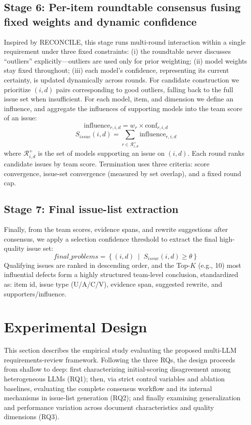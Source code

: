 \documentclass[sn-mathphys-num]{sn-jnl}
\begin{document}
\subsection{Stage 6: Per-item roundtable consensus fusing fixed weights and dynamic confidence}
Inspired by RECONCILE, this stage runs multi-round interaction within a single requirement under three fixed constraints: (i) the roundtable never discusses ``outliers'' explicitly---outliers are used only for prior weighting; (ii) model weights stay fixed throughout; (iii) each model's confidence, representing its current certainty, is updated dynamically across rounds. For candidate construction we prioritize $(i,d)$ pairs corresponding to good outliers, falling back to the full issue set when insufficient. For each model, item, and dimension we define an influence, and aggregate the influences of supporting models into the team score of an issue:
\begin{equation}
\mathrm{influence}_{r,i,d} = w_r \times \mathrm{conf}_{r,i,d}
\label{eq:influence}
\end{equation}
\begin{equation}
S_{issue}(i,d) = \sum_{r \in \mathcal{R}^{+}_{i,d}} \mathrm{influence}_{r,i,d}
\label{eq:Sissue}
\end{equation}
where $\mathcal{R}^{+}_{i,d}$ is the set of models supporting an issue on $(i,d)$. Each round ranks candidate issues by team score. Termination uses three criteria: score convergence, issue-set convergence (measured by set overlap), and a fixed round cap.

\subsection{Stage 7: Final issue-list extraction}
Finally, from the team scores, evidence spans, and rewrite suggestions after consensus, we apply a selection confidence threshold to extract the final high-quality issue set:
\begin{equation}
\mathit{final\_problems} = \left\{ (i,d) \;\middle|\; S_{issue}(i,d) \ge \theta \right\}
\label{eq:final}
\end{equation}
Qualifying issues are ranked in descending order, and the Top-$K$ (e.g., 10) most influential defects form a highly structured team-level conclusion, standardized as: item id, issue type (U/A/C/V), evidence span, suggested rewrite, and supporters/influence.

\section{Experimental Design}\label{sec:experiment}
This section describes the empirical study evaluating the proposed multi-LLM requirements-review framework. Following the three RQs, the design proceeds from shallow to deep: first characterizing initial-scoring disagreement among heterogeneous LLMs (RQ1); then, via strict control variables and ablation baselines, evaluating the complete consensus workflow and its internal mechanisms in issue-list generation (RQ2); and finally examining generalization and performance variation across document characteristics and quality dimensions (RQ3).
\end{document}
